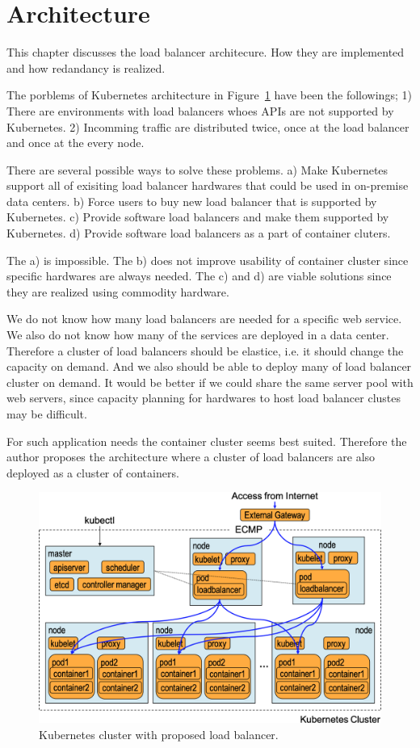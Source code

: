 \section{Architecture}

This chapter discusses the load balancer architecure.
How they are implemented and how redandancy is realized.

The porblems of Kubernetes architecture in Figure~\ref{fig:K8sProposed} have been the followings;
1) There are environments with load balancers whoes APIs are not supported by Kubernetes.
2) Incomming traffic are distributed twice, once at the load balancer and once at the every node.

There are several possible ways to solve these problems.
a) Make Kubernetes support all of exisiting load balancer hardwares that could be used in on-premise data centers.
b) Force users to buy new load balancer that is supported by Kubernetes.
c) Provide software load balancers and make them supported by Kubernetes.
d) Provide software load balancers as a part of container cluters.

The a) is impossible. The b) does not improve usability of container cluster since specific hardwares are always needed.
The c) and d) are viable solutions since they are realized using commodity hardware.

We do not know how many load balancers are needed for a specific web service.
We also do not know how many of the services are deployed in a data center.
Therefore a cluster of load balancers should be elastice, i.e. it should change the capacity on demand.
And we also should be able to deploy many of load balancer cluster on demand.
It would be better if we could share the same server pool with web servers, since capacity planning for hardwares to host load balancer clustes may be difficult.

For such application needs the container cluster seems best suited.
Therefore the author proposes the architecture where a cluster of load balancers are also deployed as a cluster of containers.

\begin{figure}
  \centering
  \includegraphics[width=0.8\columnwidth]{Figs/K8sProposed}
  \caption{Kubernetes cluster with proposed load balancer.}
  \label{fig:K8sProposed}
\end{figure}

